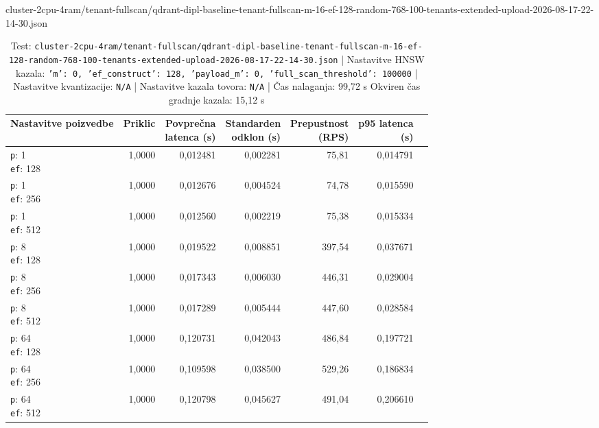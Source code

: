 \begin{table}[htbp]
  \centering
\small
  \caption{cluster-2cpu-4ram/tenant-fullscan/qdrant-dipl-baseline-tenant-fullscan-m-16-ef-128-random-768-100-tenants-extended-upload-2026-08-17-22-14-30.json}
  \label{tab:cluster-2cpu-4ram:tenant-fullscan:qdrant-dipl-baseline-tenant-fullscan-m-16-ef-128-random-768-100-tenants-extended-upload-2026-08-17-22-14-30.json}
  \begin{tabularx}{\textwidth}{Xrrrrrr}
    \toprule
    Nastavitve poizvedbe & Priklic & \makecell{Povprečna\\latenca (s)} & \makecell{Standarden\\odklon (s)} & \makecell{Prepustnost\\(RPS)} & \makecell{p95 latenca\\(s)}  \\
    \midrule
    \makecell{\texttt{p}: 1\\\texttt{ef}: 128} & 1,0000 & 0,012481 & 0,002281 & 75,81 & 0,014791 \\
    \makecell{\texttt{p}: 1\\\texttt{ef}: 256} & 1,0000 & 0,012676 & 0,004524 & 74,78 & 0,015590 \\
    \makecell{\texttt{p}: 1\\\texttt{ef}: 512} & 1,0000 & 0,012560 & 0,002219 & 75,38 & 0,015334 \\
    \makecell{\texttt{p}: 8\\\texttt{ef}: 128} & 1,0000 & 0,019522 & 0,008851 & 397,54 & 0,037671 \\
    \makecell{\texttt{p}: 8\\\texttt{ef}: 256} & 1,0000 & 0,017343 & 0,006030 & 446,31 & 0,029004 \\
    \makecell{\texttt{p}: 8\\\texttt{ef}: 512} & 1,0000 & 0,017289 & 0,005444 & 447,60 & 0,028584 \\
    \makecell{\texttt{p}: 64\\\texttt{ef}: 128} & 1,0000 & 0,120731 & 0,042043 & 486,84 & 0,197721 \\
    \makecell{\texttt{p}: 64\\\texttt{ef}: 256} & 1,0000 & 0,109598 & 0,038500 & 529,26 & 0,186834 \\
    \makecell{\texttt{p}: 64\\\texttt{ef}: 512} & 1,0000 & 0,120798 & 0,045627 & 491,04 & 0,206610 \\
    \bottomrule
  \end{tabularx}
\caption* {Test: \texttt{cluster-2cpu-4ram/tenant-fullscan/qdrant-dipl-baseline-tenant-fullscan-m-16-ef-128-random-768-100-tenants-extended-upload-2026-08-17-22-14-30.json} | Nastavitve HNSW kazala: \texttt{{'m': 0, 'ef\_construct': 128, 'payload\_m': 0, 'full\_scan\_threshold': 100000}} | Nastavitve kvantizacije: \texttt{N/A} | Nastavitve kazala tovora: \texttt{N/A} | Čas nalaganja: 99,72 s Okviren čas gradnje kazala: 15,12 s}\end{table}


